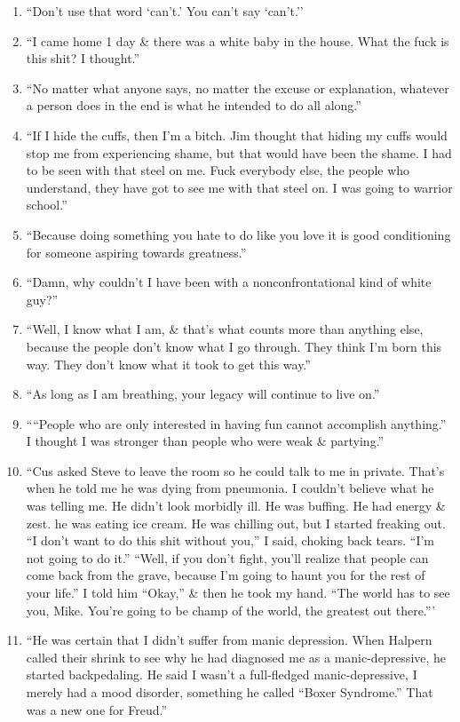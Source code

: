 \documentclass{article}
\numberwithin{equation}{section}
\begin{document}
\begin{enumerate}
	\item ``Don't use that word `can't.' You can't say `can't.''
	\item ``I came home 1 day \& there was a white baby in the house. What the fuck is this shit? I thought.''
	\item ``No matter what anyone says, no matter the excuse or explanation, whatever a person does in the end is what he intended to do all along.''
	\item ``If I hide the cuffs, then I'm a bitch. Jim thought that hiding my cuffs would stop me from experiencing shame, but that would have been the shame. I had to be seen with that steel on me. Fuck everybody else, the people who understand, they have got to see me with that steel on. I was going to warrior school.''
	\item ``Because doing something you hate to do like you love it is good conditioning for someone aspiring towards greatness.''
	\item ``Damn, why couldn't I have been with a nonconfrontational kind of white guy?''
	\item ``Well, I know what I am, \& that's what counts more than anything else, because the people don't know what I go through. They think I'm born this way. They don't know what it took to get this way.''
	\item ``As long as I am breathing, your legacy will continue to live on.''
	\item ````People who are only interested in having fun cannot accomplish anything.'' I thought I was stronger than people who were weak \& partying.''
	\item ``Cus asked Steve to leave the room so he could talk to me in private. That's when he told me he was dying from pneumonia. I couldn't believe what he was telling me. He didn't look morbidly ill. He was buffing. He had energy \& zest. he was eating ice cream. He was chilling out, but I started freaking out. ``I don't want to do this shit without you,'' I said, choking back tears. ``I'm not going to do it.'' ``Well, if you don't fight, you'll realize that people can come back from the grave, because I'm going to haunt you for the rest of your life.'' I told him ``Okay,'' \& then he took my hand. ``The world has to see you, Mike. You're going to be champ of the world, the greatest out there.'''
	\item ``He was certain that I didn't suffer from manic depression. When Halpern called their shrink to see why he had diagnosed me as a manic-depressive, he started backpedaling. He said I wasn't a full-fledged manic-depressive, I merely had a mood disorder, something he called ``Boxer Syndrome.'' That was a new one for Freud.''

\end{enumerate}
\end{document}
